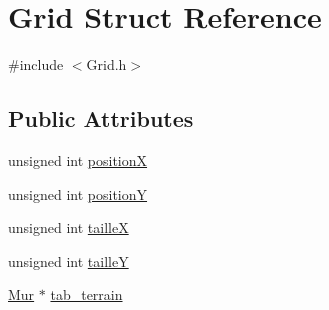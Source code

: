 \hypertarget{structGrid}{\section{Grid Struct Reference}
\label{structGrid}
}


{\ttfamily \#include $<$Grid.\-h$>$}

\subsection*{Public Attributes}
\begin{DoxyCompactItemize}
\item 
unsigned int \hyperlink{structGrid_a01a62bbb0e4ec1364b93c32e0170499b}{position\-X}
\item 
unsigned int \hyperlink{structGrid_a870a6d3ab4963b9efdc7e4fb975133d4}{position\-Y}
\item 
unsigned int \hyperlink{structGrid_ad6ec58066a6303fbc2aa5443840cf067}{taille\-X}
\item 
unsigned int \hyperlink{structGrid_adc12ffc8da211af2444db8a2007e5a7d}{taille\-Y}
\item 
\hyperlink{structMur}{Mur} $\ast$ \hyperlink{structGrid_a133dbdd9816a6ba8bd35e5787c8f2a9d}{tab\-\_\-terrain}
\end{DoxyCompactItemize}


